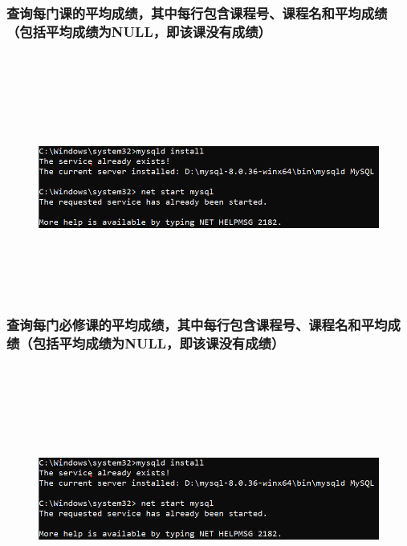 \documentclass{ctexart}
\begin{document}
\subsubsection{查询每门课的平均成绩，其中每行包含课程号、课程名和平均成绩（包括平均成绩为NULL，即该课没有成绩）}
\begin{lstlisting}[language=sql]
	
\end{lstlisting}
\begin{figure}[H]
	\centering 
	\includegraphics[height=7cm,width=14cm]{1.png}
	\end{figure}
\subsubsection{查询每门必修课的平均成绩，其中每行包含课程号、课程名和平均成绩（包括平均成绩为NULL，即该课没有成绩）}
\begin{lstlisting}[language=sql]
	
\end{lstlisting}
\begin{figure}[H]
	\centering 
	\includegraphics[height=7cm,width=14cm]{1.png}
	\end{figure}
\end{document}
